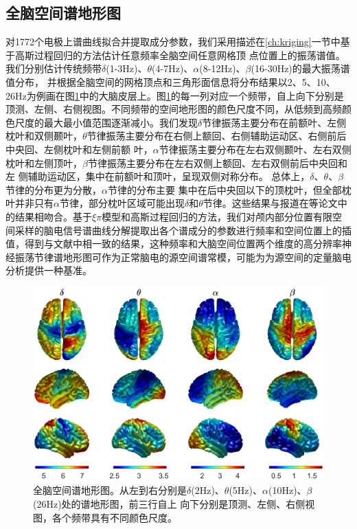 \subsection{全脑空间谱地形图}
对1772个电极上谱曲线拟合并提取成分参数，我们采用描述在\ref{ch:kriging}一节中基于高斯过程回归的方法估计任意频率全脑空间任意网格顶
点位置上的振荡谱值。我们分别估计传统频带$\delta$(1-3Hz)、$\theta$(4-7Hz)、$\alpha$(8-12Hz)、$\beta$(16-30Hz)的最大振荡谱值分布，
并根据全脑空间的网格顶点和三角形面信息将分布结果以2、5、10、26Hz为例画在图\ref{7:map}中的大脑皮层上。图\ref{7:map}的每一列对应一个频带，自上向下分别是顶测、左侧、右侧视图。不同频带的空间地形图的颜色尺度不同，从低频到高频颜色尺度的最大最小值范围逐渐减小。我们发现$\delta$节律振荡主要分布在前额叶、左侧枕叶和双侧颞叶，$\theta$节律振荡主要分布在右侧上额回、右侧辅助运动区、右侧前后中央回、左侧枕叶和左侧前额
叶，$\alpha$节律振荡主要分布在左右双侧颞叶、左右双侧枕叶和左侧顶叶，$\beta$节律振荡主要分布在左右双侧上额回、左右双侧前后中央回和左
侧辅助运动区，集中在前额叶和顶叶，呈现双侧对称分布。 总体上，$\delta$、$\theta$、$\beta$节律的分布更为分散，$\alpha$节律的分布主要
集中在后中央回以下的顶枕叶，但全部枕叶并非只有$\alpha$节律，部分枕叶区域可能出现$\delta$和$\theta$节律。这些结果与报道在\cite{gastaut1949enregistrement,jasper1949electrocorticograms,sem1953depth,chatrian1960depth,sem1956electroencephalographic,perez1962electrographic,graf1984electrocorticography,frauscher2018atlas}等论文中的结果相吻合。基于$\xi\pi$模型和高斯过程回归的方法，我们对颅内部分位置有限空间采样的脑电信号谱曲线分解提取出各个谱成分的参数进行频率和空间位置上的插值，得到与文献中相一致的结果，这种频率和大脑空间位置两个维度的高分辨率神经振荡节律谱地形图可作为正常脑电的源空间谱常模，可能为为源空间的定量脑电分析提供一种基准。
\begin{figure}[!h]
	\includegraphics[width=15cm]{pic/xipi/map.png}
	\caption{全脑空间谱地形图。从左到右分别是$\delta$(2Hz)、$\theta$(5Hz)、$\alpha$(10Hz)、$\beta$(26Hz)处的谱地形图，前三行自上
	向下分别是顶测、左侧、右侧视图，各个频带具有不同颜色尺度。}
	\label{7:map}
\end{figure}

